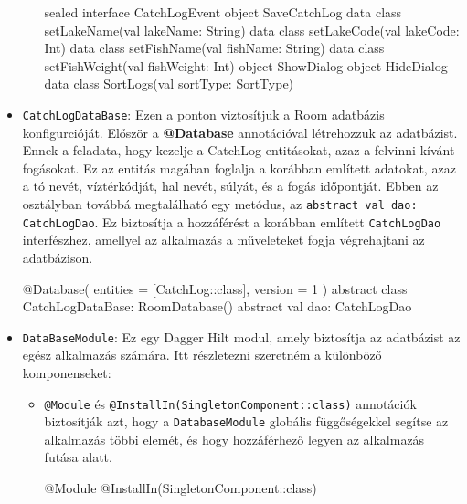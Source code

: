 \begin{itemize}
\begin{itemize}
\begin{java}[caption = { A CatchLogEvent eseményei. }]
sealed interface CatchLogEvent {
object SaveCatchLog
data class setLakeName(val lakeName: String)
data class setLakeCode(val lakeCode: Int)
data class setFishName(val fishName: String)
data class setFishWeight(val fishWeight: Int)
object ShowDialog
object HideDialog
data class SortLogs(val sortType: SortType)
}
\end{java}
    \end{itemize}
    \item \texttt{CatchLogDataBase}: Ezen a ponton viztosítjuk a Room adatbázis konfigurcióját.
    Először a \textbf{@Database} annotációval létrehozzuk az adatbázist. Ennek a feladata, hogy kezelje a CatchLog entitásokat, azaz a felvinni kívánt fogásokat. Ez az entitás magában foglalja a korábban említett adatokat, azaz a tó nevét, víztérkódját, hal nevét, súlyát, és a fogás időpontját. Ebben az osztályban továbbá megtalálható egy metódus, az \texttt{abstract val dao: CatchLogDao}. Ez biztosítja a hozzáférést a korábban említett \texttt{CatchLogDao} interfészhez, amellyel az alkalmazás a műveleteket fogja végrehajtani az adatbázison.

\begin{java}[caption = {CatchLogDataBase osztálya.}]
    @Database(
    entities = [CatchLog::class],
    version = 1
)
abstract class CatchLogDataBase: RoomDatabase() {
    abstract val dao: CatchLogDao
}
\end{java}
    \item \texttt{DataBaseModule}: Ez egy Dagger Hilt modul, amely biztosítja az adatbázist az egész alkalmazás számára. Itt részletezni szeretném a különböző komponenseket:
    \begin{itemize}
        \item \texttt{@Module} és \texttt{@InstallIn(SingletonComponent::class)} annotációk biztosítják azt, hogy a \texttt{DatabaseModule} globális függőségekkel segítse az alkalmazás többi elemét, és hogy hozzáférhező legyen az alkalmazás futása alatt.
        
\begin{java}[caption = {DataBaseModul-ban szereplő annotációk.}]
@Module
@InstallIn(SingletonComponent::class)
\end{java}


\end{itemize}
\end{itemize}
